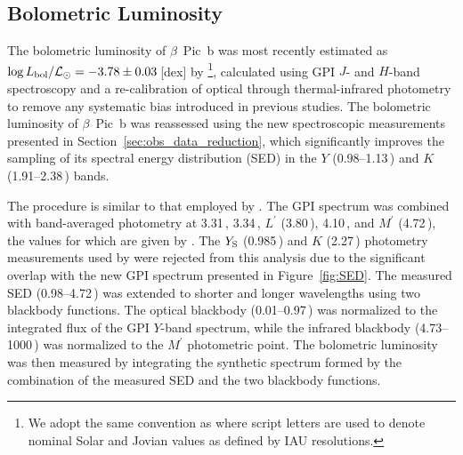 \documentclass[twocolumn]{aastex6}
\begin{document}
\subsection{Bolometric Luminosity}
\label{sec:bol_lum}
The bolometric luminosity of $\beta$~Pic~b was most recently estimated as $\log L_{\rm bol}/{\mathcal L}_{\odot}=-3.78\pm0.03$\,[dex] by \citet{Morzinski2015}\footnote{We adopt the same convention as \citet{Morzinski2015} where script letters are used to denote nominal Solar and Jovian values as defined by IAU resolutions.}, calculated using GPI $J$- and $H$-band spectroscopy and a re-calibration of optical through thermal-infrared photometry to remove any systematic bias introduced in previous studies. The bolometric luminosity of $\beta$~Pic~b was reassessed using the new spectroscopic measurements presented in Section~\ref{sec:obs_data_reduction}, which significantly improves the sampling of its spectral energy distribution (SED) in the $Y$ (0.98--1.13\,\micron) and $K$ (1.91--2.38\,\micron) bands.

The procedure is similar to that employed by \citet{Morzinski2015}. The GPI spectrum was combined with band-averaged photometry at 3.31\,\micron, 3.34\,\micron, $L^{\prime}$ (3.80\,\micron), 4.10\,\micron, and $M^{\prime}$ (4.72\,\micron), the values for which are given by \citet{Morzinski2015}. The $Y_{\rm S}$ (0.985\,\micron) and $K$ (2.27\,\micron) photometry measurements used by \citet{Morzinski2015} were rejected from this analysis due to the significant overlap with the new GPI spectrum presented in Figure~\ref{fig:SED}. The measured SED (0.98--4.72\,\micron) was extended to shorter and longer wavelengths using two blackbody functions. The optical blackbody (0.01--0.97\,\micron) was normalized to the integrated flux of the GPI $Y$-band spectrum, while the infrared blackbody (4.73--1000\,\micron) was normalized to the $M^{\prime}$ photometric point. The bolometric luminosity was then measured by integrating the synthetic spectrum formed by the combination of the measured SED and the two blackbody functions. 
\end{document}
